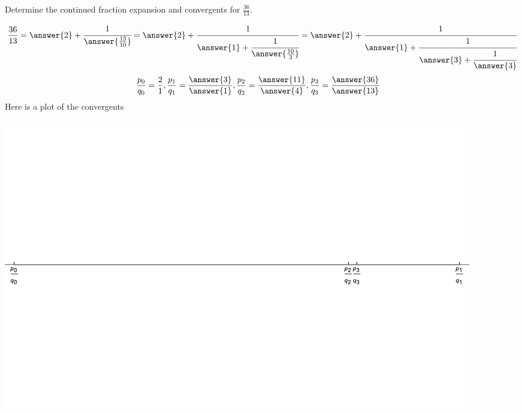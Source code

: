 \documentclass{ximera}
\begin{document}
\begin{example}
 Determine the continued fraction expansion and convergents for $\frac{36}{13}$. 
 
\begin{align*}
 \frac{36}{13}=\answer{2}+\cfrac{1}{\answer{\frac{13}{10}}}=\answer{2}+\cfrac{1}{\answer{1}+\cfrac{1}{\answer{\frac{10}{3}}}}=\answer{2}+\cfrac{1}{\answer{1}+\cfrac{1}{\answer{3}+\cfrac{1}{\answer{3}}}}
\end{align*}
\begin{align*}
  \frac{p_0}{q_0}&=\frac{2}{1}, \frac{p_1}{q_1}=\frac{\answer{3}}{\answer{1}},\frac{p_2}{q_2}=\frac{\answer{11}}{\answer{4}}, \frac{p_3}{q_3}=\frac{\answer{36}}{\answer{13}}\end{align*}
Here is a plot of the convergents
\begin{image}
 \includegraphics[width=\textwidth]{example0}
\end{image}
\end{example}
\end{document}
